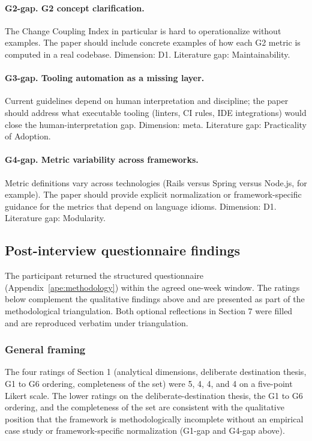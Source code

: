 \paragraph*{G2-gap. G2 concept clarification.} The Change Coupling Index in particular is hard to operationalize without examples. The paper should include concrete examples of how each G2 metric is computed in a real codebase. Dimension: D1. Literature gap: Maintainability.

\paragraph*{G3-gap. Tooling automation as a missing layer.} Current guidelines depend on human interpretation and discipline; the paper should address what executable tooling (linters, CI rules, IDE integrations) would close the human-interpretation gap. Dimension: meta. Literature gap: Practicality of Adoption.

\paragraph*{G4-gap. Metric variability across frameworks.} Metric definitions vary across technologies (Rails versus Spring versus Node.js, for example). The paper should provide explicit normalization or framework-specific guidance for the metrics that depend on language idioms. Dimension: D1. Literature gap: Modularity.

\subsection*{Post-interview questionnaire findings}

The participant returned the structured questionnaire (Appendix~\ref{ape:methodology}) within the agreed one-week window. The ratings below complement the qualitative findings above and are presented as part of the methodological triangulation. Both optional reflections in Section 7 were filled and are reproduced verbatim under triangulation.

\subsubsection*{General framing}

The four ratings of Section 1 (analytical dimensions, deliberate destination thesis, G1 to G6 ordering, completeness of the set) were 5, 4, 4, and 4 on a five-point Likert scale. The lower ratings on the deliberate-destination thesis, the G1 to G6 ordering, and the completeness of the set are consistent with the qualitative position that the framework is methodologically incomplete without an empirical case study or framework-specific normalization (G1-gap and G4-gap above).

